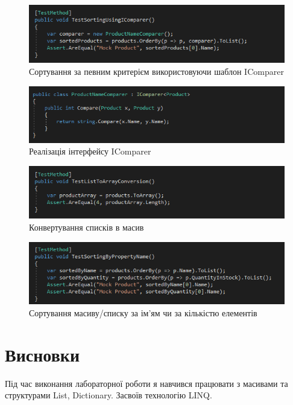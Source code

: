 \documentclass[oneside,14pt]{extarticle}
\begin{document}
\begin{normalsize}
	\begin{figure}[H]
		\centering
		\includegraphics[width=\textwidth]{6}
		\caption{Сортування за певним критерієм використовуючи шаблон IComparer}
	\end{figure}
	
	\begin{figure}[H]
		\centering
		\includegraphics[width=\textwidth]{62}
		\caption{Реалізація інтерфейсу IComparer}
	\end{figure}
	
	\begin{figure}[H]
		\centering
		\includegraphics[width=\textwidth]{7}
		\caption{Конвертування списків в масив}
	\end{figure}
	\begin{figure}[H]
		\centering
		\includegraphics[width=\textwidth]{8}
		\caption{Сортування масиву/списку за ім’ям чи за кількістю елементів}
	\end{figure}
	
	\section*{Висновки}
	   Під час виконання лабораторної роботи я навчився працювати з масивами та структурами List, Dictionary.
	   Засвоїв технологію LINQ.
\end{normalsize}
\end{document}
